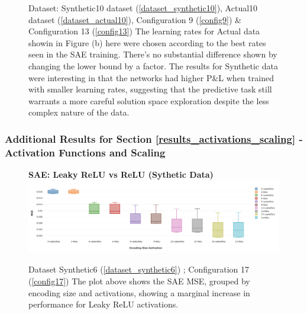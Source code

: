 \documentclass[a4paper,11pt,oneside]{article}
\theoremstyle{plain}
\theoremstyle{definition}
\begin{document}
\begin{figure}[H]
\begin{subfigure}{.5\textwidth}
{				\newline }
			\label{figure-actual_pl_minmax_lr}
		\end{subfigure}
		\caption[P\&L by Learning Rates]{Dataset: Synthetic10 dataset (\ref{dataset_synthetic10}), Actual10 dataset (\ref{dataset_actual10}), Configuration 9 (\ref{config9}) \& Configuration 13 (\ref{config13})
			\newline The learning rates for Actual data showin in Figure (b) here were chosen according to the best rates seen in the SAE training. There's no substantial difference shown by changing the lower bound by a factor. The results for Synthetic data were interesting in that the networks had higher P\&L when trained with smaller learning rates, suggesting that the predictive task still warrants a more careful solution space exploration despite the less complex nature of the data.}
		\label{figure-pl_lr}
	\end{figure}
	
	
	
	\subsubsection{Additional Results for Section \ref{results_activations_scaling} - Activation Functions and Scaling }\label{results_activations_appendix}
	
	\begin{figure}[H]
		\centering 
		\textbf{SAE: Leaky ReLU vs ReLU (Sythetic Data)} 
		\includegraphics[scale=0.28]{images/results/activations/synthetic_mse_leakyrelu.png}
		\caption[SAE: Leaky ReLU vs ReLU (Synthetic Data)]{Dataset Synthetic6  (\ref{dataset_synthetic6}) ; Configuration 17 (\ref{config17})
			\newline The plot above shows the SAE MSE, grouped by encoding size and activations, showing a marginal increase in performance for Leaky ReLU activations. }
		\label{figure-synthetic_mse_leakyrelu}
	\end{figure}
	
\end{document}
